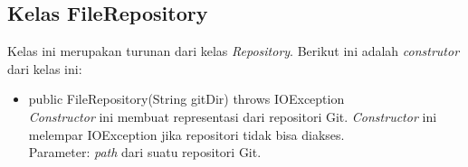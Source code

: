 \subsection{Kelas FileRepository}
\label{subsec:filerepository}
Kelas ini merupakan turunan dari kelas \textit{Repository}. Berikut ini adalah \textit{construtor} dari kelas ini:
\begin{itemize}
\item public FileRepository(String gitDir) throws IOException\\
\textit{Constructor} ini membuat representasi dari repositori Git. \textit{Constructor} ini melempar IOException jika repositori tidak bisa diakses.\\
Parameter: \textit{path} dari suatu repositori Git.
\end{itemize}

